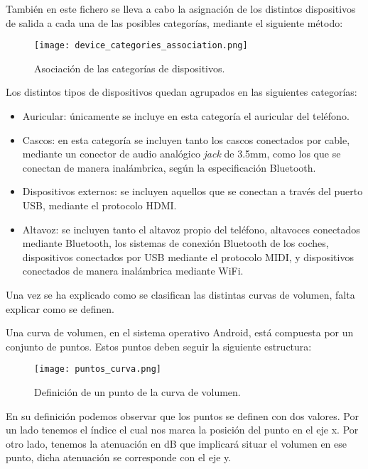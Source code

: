 También en este fichero se lleva a cabo la asignación de los distintos dispositivos de salida a cada una de las posibles categorías, mediante el siguiente método:

\begin{figure}[H]
	\centering
	\texttt{[image: device\_categories\_association.png]}
	\caption{Asociación de las categorías de dispositivos.}
	\label{fig:device_categories_association}
\end{figure}

Los distintos tipos de dispositivos quedan agrupados en las siguientes categorías:

\begin{itemize}
	\item{Auricular: únicamente se incluye en esta categoría el auricular del teléfono.}
	\item{Cascos: en esta categoría se incluyen tanto los cascos conectados por cable, mediante un conector de audio analógico \textit{jack} de 3.5mm, como los que se conectan de manera inalámbrica, según la especificación Bluetooth.}
	\item{Dispositivos externos: se incluyen aquellos que se conectan a través del puerto \gls{USB}, mediante el protocolo \gls{HDMI}.}
	\item{Altavoz: se incluyen tanto el altavoz propio del teléfono, altavoces conectados mediante Bluetooth, los sistemas de conexión Bluetooth de los coches, dispositivos conectados por \gls{USB} mediante el protocolo \gls{MIDI}, y dispositivos conectados de manera inalámbrica mediante \gls{WiFi}.}
\end{itemize}

Una vez se ha explicado como se clasifican las distintas curvas de volumen, falta explicar como se definen.

Una curva de volumen, en el sistema operativo Android, está compuesta por un conjunto de puntos. Estos puntos deben seguir la siguiente estructura:

\begin{figure}[H]
	\centering
	\texttt{[image: puntos\_curva.png]}
	\caption{Definición de un punto de la curva de volumen.}
	\label{fig:puntos_curva}
\end{figure}

En su definición podemos observar que los puntos se definen con dos valores. Por un lado tenemos el índice el cual nos marca la posición del punto en el eje x. Por otro lado, tenemos la atenuación en \gls{dB} que implicará situar el volumen en ese punto, dicha atenuación se corresponde con el eje y.

